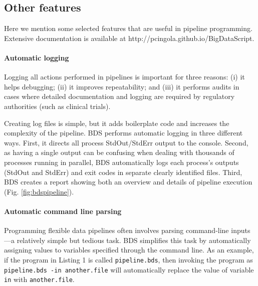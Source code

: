 \subsection{Other features}

Here we mention some selected features that are useful in pipeline programming. Extensive documentation is available at http://pcingola.github.io/BigDataScript.

\paragraph{Automatic logging} Logging all actions performed in pipelines is important for three reasons: (i) it helps debugging; (ii) it improves repeatability; and (iii) it performs audits in cases where detailed documentation and logging are required by regulatory authorities (such as clinical trials).

Creating log files is simple, but it adds boilerplate code and increases the complexity of the pipeline. BDS performs automatic logging in three different ways. First, it directs all process StdOut/StdErr output to the console. Second, as having a single output can be confusing when dealing with thousands of processes running in parallel, BDS automatically logs each process’s outputs (StdOut and StdErr) and exit codes in separate clearly identified files. Third, BDS creates a report showing both an overview and details of pipeline execution (Fig. \ref{fig:bdspipeline}).

\paragraph{Automatic command line parsing} Programming flexible data pipelines often involves parsing command-line inputs—a relatively simple but tedious task. BDS simplifies this task by automatically assigning values to variables specified through the command line. As an example, if the program in Listing 1 is called \texttt{pipeline.bds}, then invoking the program as \texttt{pipeline.bds -in another.file} will automatically replace the value of variable \texttt{in} with \texttt{another.file}.

